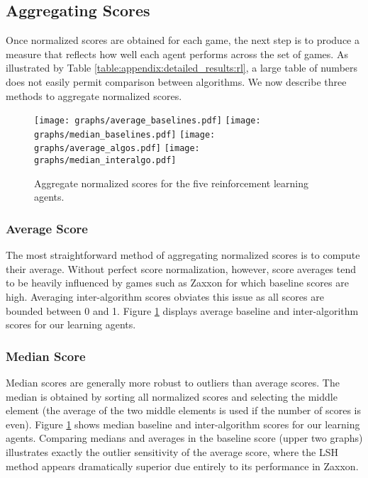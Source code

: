 \documentclass[twoside,11pt]{article}
\newcommand{\gamename}[1]{{\sc #1}}
\begin{document}
\subsection{Aggregating Scores}

Once normalized scores are obtained for each game, the next step is to produce a measure that reflects how well each agent performs across the set of games. As illustrated by Table \ref{table:appendix:detailed_results:rl}, a large table of numbers does not easily permit comparison between algorithms. We now describe three methods to aggregate normalized scores.

\begin{figure}
\begin{center}
\texttt{[image: graphs/average\_baselines.pdf]}
\texttt{[image: graphs/median\_baselines.pdf]}
\texttt{[image: graphs/average\_algos.pdf]}
\texttt{[image: graphs/median\_interalgo.pdf]}
\caption{
Aggregate normalized scores for the five reinforcement learning agents.
\label{fig:evaluation:aggregate_scores}}
\end{center}
\end{figure}

\subsubsection{Average Score}

The most straightforward method of aggregating normalized scores is to compute their average. Without perfect score normalization, however, score averages tend to be heavily influenced by games such as \gamename{Zaxxon} for which baseline scores are high. Averaging inter-algorithm scores obviates this issue as all 
scores are bounded between 0 and 1. Figure \ref{fig:evaluation:aggregate_scores} displays average 
baseline and inter-algorithm scores for our learning agents.

\subsubsection{Median Score}

Median scores are generally more robust to outliers than average scores. The median is obtained by sorting all normalized scores and selecting the middle element (the average of the two middle elements is used if the number of scores is even). Figure \ref{fig:evaluation:aggregate_scores} shows median baseline and inter-algorithm scores for our learning agents.  Comparing medians and averages in the baseline score (upper two graphs) illustrates exactly the outlier sensitivity of the average score, where the LSH method appears dramatically superior due entirely to its performance in \gamename{Zaxxon}.  
\end{document}

